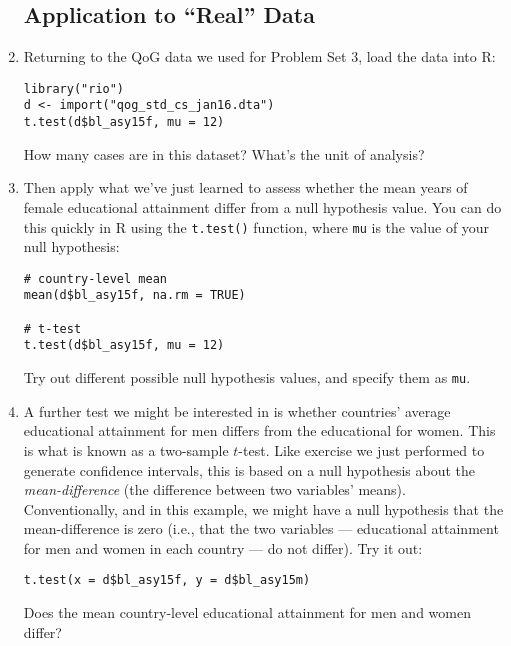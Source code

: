 \documentclass[a4paper,12pt]{article}
\begin{document}
\begin{enumerate}
\vspace{4em}

\subsection{Application to ``Real'' Data}

\item Returning to the QoG data we used for Problem Set 3, load the data into R:

\begin{verbatim}
library("rio")
d <- import("qog_std_cs_jan16.dta")
t.test(d$bl_asy15f, mu = 12)
\end{verbatim}

\noindent How many cases are in this dataset? What's the unit of analysis?

\item Then apply what we've just learned to assess whether the mean years of female educational attainment differ from a null hypothesis value. You can do this quickly in R using the \texttt{t.test()} function, where \texttt{mu} is the value of your null hypothesis:

\begin{verbatim}
# country-level mean
mean(d$bl_asy15f, na.rm = TRUE)

# t-test
t.test(d$bl_asy15f, mu = 12)
\end{verbatim}

\noindent Try out different possible null hypothesis values, and specify them as \texttt{mu}.

\item A further test we might be interested in is whether countries' average educational attainment for men differs from the educational for women. This is what is known as a two-sample $t$-test. Like exercise we just performed to generate confidence intervals, this is based on a null hypothesis about the \textit{mean-difference} (the difference between two variables' means). Conventionally, and in this example, we might have a null hypothesis that the mean-difference is zero (i.e., that the two variables --- educational attainment for men and women in each country --- do not differ). Try it out:

\begin{verbatim}
t.test(x = d$bl_asy15f, y = d$bl_asy15m)
\end{verbatim}

\noindent Does the mean country-level educational attainment for men and women differ?


\end{enumerate}
\end{document}
